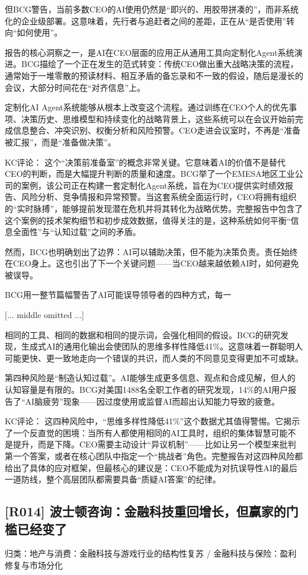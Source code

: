 \documentclass[11pt]{ctexart}
\begin{document}
但BCG警告，当前多数CEO的AI使用仍然是“即兴的、用胶带拼凑的”，而非系统化的企业级部署。这意味着，先行者与追赶者之间的差距，正在从“是否使用”转向“如何使用”。

报告的核心洞察之一，是AI在CEO层面的应用正从通用工具向定制化Agent系统演进。BCG描绘了一个正在发生的范式转变：传统CEO做出重大战略决策的流程，通常始于一堆零散的预读材料、相互矛盾的备忘录和不一致的假设，随后是漫长的会议，大部分时间花在“对齐信息”上。

定制化AI Agent系统能够从根本上改变这个流程。通过训练在CEO个人的优先事项、决策历史、思维模型和持续变化的战略背景上，这些系统可以在会议开始前完成信息整合、冲突识别、权衡分析和风险预警。CEO走进会议室时，不再是“准备被汇报”，而是“准备做决策”。

KC评论： 这个“决策前准备室”的概念非常关键。它意味着AI的价值不是替代CEO的判断，而是大幅提升判断的质量和速度。BCG举了一个EMESA地区工业公司的案例，该公司正在构建一套定制化Agent系统，旨在为CEO提供实时绩效报告、风险分析、竞争情报和异常预警。当这套系统全面运行时，CEO将拥有组织的“实时脉搏”，能够提前发现潜在危机并将其转化为战略优势。完整报告中包含了这个案例的技术架构细节和初步成效数据，值得关注的是，这种系统如何平衡“信息全面性”与“认知过载”之间的矛盾。

然而，BCG也明确划出了边界：AI可以辅助决策，但不能为决策负责。责任始终在CEO身上。这也引出了下一个关键问题——当CEO越来越依赖AI时，如何避免被误导。

BCG用一整节篇幅警告了AI可能误导领导者的四种方式，每一

[... middle omitted ...]

相同的工具、相同的数据和相同的提示词，会强化相同的假设。BCG的研究发现，生成式AI的通用化输出会使团队的思维多样性降低41\%。这意味着一群聪明人可能更快、更一致地走向一个错误的共识，而人类的不同意见变得更加不可或缺。

第四种风险是“制造认知过载”。AI能够生成更多信息、观点和合成见解，但人的认知容量是有限的。BCG对美国1488名全职工作者的研究发现，14\%的AI用户报告了“AI脑疲劳”现象——因过度使用或监督AI而超出认知能力导致的疲惫。

KC评论： 这四种风险中，“思维多样性降低41\%”这个数据尤其值得警惕。它揭示了一个反直觉的困境：当所有人都使用相同的AI工具时，组织的集体智慧可能不是提升，而是下降。CEO需要主动设计“异议机制”——比如让另一个模型来批判第一个答案，或者在核心团队中指定一个“挑战者”角色。完整报告对这四种风险都给出了具体的应对框架，但最核心的建议是：CEO不能成为对抗误导性AI的最后一道防线，整个高层团队都需要具备“质疑AI答案”的纪律。

\subsection{[R014] 波士顿咨询：金融科技重回增长，但赢家的门槛已经变了}
{\small\color{refgray}归类：地产与消费：金融科技与游戏行业的结构性复苏 / 金融科技与保险：盈利修复与市场分化}
\end{document}
